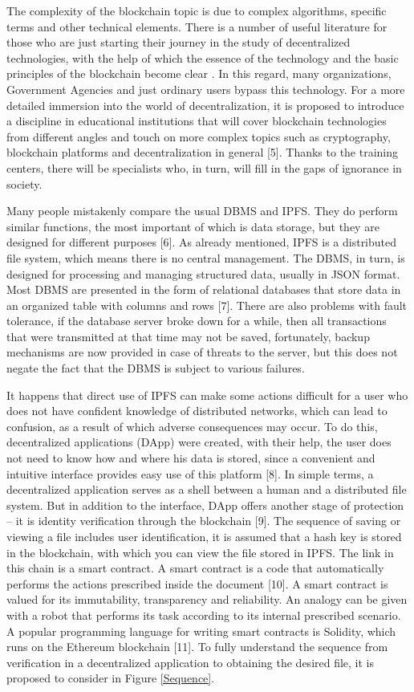 \documentclass[10pt,conference,a4paper]{IEEEtran_EDM}
\begin{document}
The complexity of the blockchain topic is due to complex algorithms, specific terms and other technical elements. There is a number of useful literature for those who are just starting their journey in the study of decentralized technologies, with the help of which the essence of the technology and the basic principles of the blockchain become clear \cite{Kube}. In this regard, many organizations, Government Agencies and just ordinary users bypass this technology. For a more detailed immersion into the world of decentralization, it is proposed to introduce a discipline in educational institutions that will cover blockchain technologies from different angles and touch on more complex topics such as cryptography, blockchain platforms and decentralization in general [5]. Thanks to the training centers, there will be specialists who, in turn, will fill in the gaps of ignorance in society.

Many people mistakenly compare the usual DBMS and IPFS. They do perform similar functions, the most important of which is data storage, but they are designed for different purposes [6]. As already mentioned, IPFS is a distributed file system, which means there is no central management. The DBMS, in turn, is designed for processing and managing structured data, usually in JSON format. Most DBMS are presented in the form of relational databases that store data in an organized table with columns and rows [7]. There are also problems with fault tolerance, if the database server broke down for a while, then all transactions that were transmitted at that time may not be saved, fortunately, backup mechanisms are now provided in case of threats to the server, but this does not negate the fact that the DBMS is subject to various failures. 

It happens that direct use of IPFS can make some actions difficult for a user who does not have confident knowledge of distributed networks, which can lead to confusion, as a result of which adverse consequences may occur. To do this, decentralized applications (DApp) were created, with their help, the user does not need to know how and where his data is stored, since a convenient and intuitive interface provides easy use of this platform [8]. In simple terms, a decentralized application serves as a shell between a human and a distributed file system. But in addition to the interface, DApp offers another stage of protection – it is identity verification through the blockchain [9]. The sequence of saving or viewing a file includes user identification, it is assumed that a hash key is stored in the blockchain, with which you can view the file stored in IPFS. The link in this chain is a smart contract. A smart contract is a code that automatically performs the actions prescribed inside the document [10]. A smart contract is valued for its immutability, transparency and reliability. An analogy can be given with a robot that performs its task according to its internal prescribed scenario. A popular programming language for writing smart contracts is Solidity, which runs on the Ethereum blockchain [11]. To fully understand the sequence from verification in a decentralized application to obtaining the desired file, it is proposed to consider in Figure \ref{Sequence}.
\end{document}
